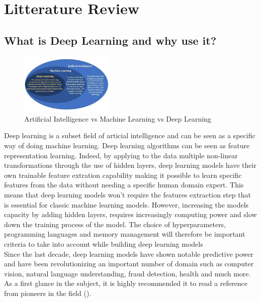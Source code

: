 \documentclass[6pt,letter]{article}\usepackage[]{graphicx}\usepackage[]{color}
\begin{document}
\section{Litterature Review}
\subsection{What is Deep Learning and why use it?}
\begin{figure}
  \begin{center}
    \includegraphics[width=0.4\textwidth]{figure/deep learning.PNG}
      \end{center}
     \caption{Artificial Intelligence vs Machine Learning vs Deep Learning}
     \label{fig:simule}
\end{figure}

Deep learning is a subset field of articial intelligence and can be seen as a specific way of doing machine learning. Deep learning algorithms can be seen as feature representation learning. Indeed, by applying to the data multiple non-linear transformations through the use of hidden layers, deep learning models have their own trainable feature extration capability making it possible to learn specific features from the data without needing a specific human domain expert. This means that deep learning models won't require the features extraction step that is essential for classic machine learning models. However, increasing the models capacity by adding hidden layers, requires increasingly computing power and slow down the training process of the model. The choice of hyperparameters, programming languages and memory management will therefore be important criteria to take into account while building deep learning models\\
Since the last decade, deep learning models have shown notable predictive power and have been revolutionizing an important number of domain such as computer vision, natural language understanding, fraud detection, health and much more.\\
As a first glance in the subject, it is highly recommended it to read  a reference from pioneers in the field (\cite[Chapter 1]{Goodfellow-et-al-2016}).
\end{document}
